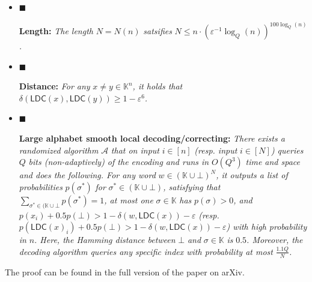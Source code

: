 \begin{itemize}


\item[] 
$\blacksquare$ 


\textbf{Length:}\emph{ The length }$N=N(n)$\emph{ satsifies }$N\leq n\cdot(\varepsilon^{-1}\log_{Q}(n))^{100\log_{Q}(n)}$\emph{.}\par





\item[] 
$\blacksquare$ 


\textbf{Distance:}\emph{
For any }$x\not=y\in\mathbb{K}^{n}$\emph{, it holds that }$\delta(\mathsf{LDC}(x),\mathsf{LDC}(y))\geq 1-\varepsilon^{6}$\emph{.}\par





\item[] 
$\blacksquare$ 


\textbf{Large alphabet smooth local decoding/correcting:}\emph{
There exists a randomized algorithm }$\mathcal{A}$\emph{ that on input }$i\in[n]$\emph{ (resp. input }$i\in[N]$\emph{) queries }$Q$\emph{ bits (non-adaptively) of the encoding and runs in }$O(Q^{3})$\emph{ time and space and does the following. For any word }$w\in(\mathbb{K}\cup\bot)^{N}$\emph{, it outputs a list of probabilities }$p(\sigma^{*})$\emph{ for }$\sigma^{*}\in(\mathbb{K}\cup\bot)$\emph{, satisfying that }$\sum_{\sigma^{*}\in(\mathbb{K}\cup\bot}p(\sigma^{*})=1$\emph{, at most one }$\sigma\in\mathbb{K}$\emph{ has }$p(\sigma)>0$\emph{, and }$p(x_{i})+0.5p(\bot)>1-\delta(w,\mathsf{LDC}(x))-\varepsilon$\emph{ (resp. }$p(\mathsf{LDC}(x)_{i})+0.5p(\bot)>1-\delta(w,\mathsf{LDC}(x))-\varepsilon$\emph{) with high probability in }$n$\emph{. Here, the Hamming distance between }$\bot$\emph{ and }$\sigma\in\mathbb{K}$\emph{ is }$0.5$\emph{.
Moreover, the decoding algorithm queries any specific index with probability at most }$\frac{1.1Q}{N}$\emph{.}\par





\end{itemize}






The proof can be found in the full version of the paper on arXiv.\par






